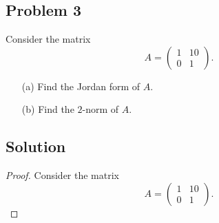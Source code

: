 \documentclass[12pt]{report}
\begin{document}
\begin{problem}%
\subsection*{Problem 3}

Consider the matrix
\[
    A = \begin{pmatrix}
        1 & 10\\
        0 & 1
    \end{pmatrix}.
\]
\begin{enumerate}
    \item [(a)] Find the Jordan form of $A$.
    \item [(b)] Find the $2$-norm of $A$.
\end{enumerate}

\subsection*{Solution}
\begin{proof}

Consider the matrix
\[
    A = \begin{pmatrix}
        1 & 10\\
        0 & 1
    \end{pmatrix}.
\]


\end{proof}
\end{problem}
\end{document}
